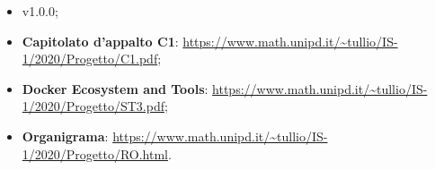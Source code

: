 \begin{itemize}
    \item \NdP{} v1.0.0;
    \item \textbf{Capitolato d'appalto C1}: \url{https://www.math.unipd.it/~tullio/IS-1/2020/Progetto/C1.pdf};
    \item \textbf{Docker Ecosystem and Tools}: \url{https://www.math.unipd.it/~tullio/IS-1/2020/Progetto/ST3.pdf};
    \item \textbf{Organigrama}: \url{https://www.math.unipd.it/~tullio/IS-1/2020/Progetto/RO.html}.
\end{itemize}